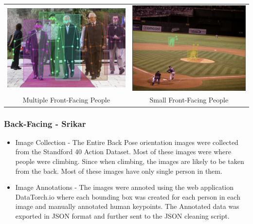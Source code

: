 \documentclass[a4paper,12pt]{article}
\begin{document}
\begin{center}
\begin{tabular}{cc}
\includegraphics[scale=0.22]{front_label.png}
&
\includegraphics[scale=0.2]{front_label_small.png}
\\
Multiple Front-Facing People & Small Front-Facing People
\end{tabular}
\end{center}

\subsubsection{Back-Facing - Srikar}
\begin{itemize}
    \item Image Collection - The Entire Back Pose orientation images were collected from the  Standford 40 Action Dataset\autocite{inproceedings}. Most of these images were where people were climbing. Since when climbing, the images are likely to be taken from the back. Most of these images have only single person in them.
     \item Image Annotations - The images were annoted using the web application DataTorch.io where each bounding box was created for each person in each image and manually annotated human keypoints. The Annotated data was exported in JSON format and further sent to the JSON cleaning script. 
    
\end{itemize}
\end{document}
